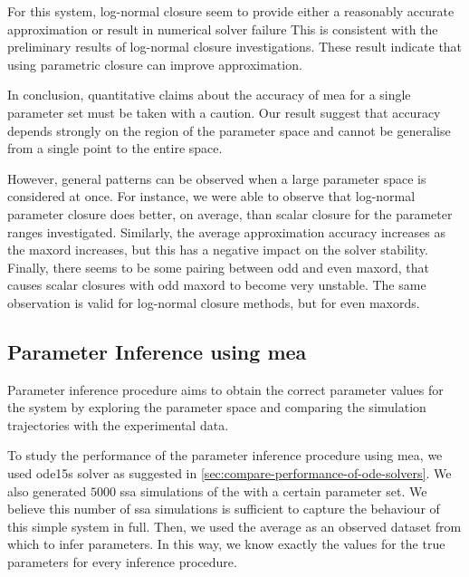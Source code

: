 For this system, log-normal closure seem to provide either a reasonably accurate approximation or result in numerical solver failure
This is consistent with the preliminary results of log-normal closure investigations\cite{lakatos_preparation_2014}.
These result indicate that using parametric closure can improve approximation.

In conclusion, quantitative claims about the accuracy of \gls{mea} for a single parameter set must be taken with a caution.
Our result suggest that accuracy depends strongly on the region of the parameter space and cannot be generalise from a single point to the entire space.

However, general patterns can be observed when a large parameter space is considered at once. 
For instance, we were able to observe that log-normal parameter closure does better, on average, than scalar closure for the parameter ranges investigated. 
Similarly, the average approximation accuracy increases as the \gls{maxord} increases, but this has a negative impact on the solver stability.
Finally, there seems to be some pairing between odd and even \gls{maxord}, 
that causes scalar closures with odd \gls{maxord} to become very unstable.
The same observation is valid for log-normal closure methods, but for even \gls{maxord}s.



\subsection{Parameter Inference using \acrlong{mea}}
\label{sec:results:inference}
Parameter inference procedure aims to obtain the correct parameter values for the system by exploring the parameter space and comparing the simulation trajectories with the experimental data.

To study the performance of the parameter inference procedure using \acrlong{mea},
we used ode15s solver as suggested in \autoref{sec:compare-performance-of-ode-solvers}. We also generated $5000$ \acrfull{ssa} simulations of the \pft{} with a certain parameter set. 
We believe this number of \gls{ssa} simulations is sufficient to capture the behaviour of this simple system in full.
Then, we used the average as an observed dataset from which to infer parameters.
In this way, we know exactly the values for the true parameters for every inference procedure.

